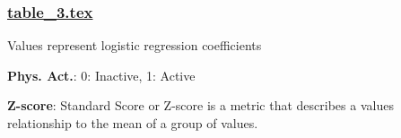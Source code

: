\documentclass[11pt]{article}
\begin{document}
\subsubsection*{\hyperlink{code-LaTeX Table Design-table-3-tex}{table\_3.tex}}

\begin{codeoutput}
\begin{table}[h]
\caption{Association between physical activity and heart disease among diabetics}
\label{table:association_coronary}
\begin{threeparttable}
\renewcommand{\TPTminimum}{\linewidth}
\begin{tablenotes}
\footnotesize
\item Values represent logistic regression coefficients
\item \textbf{Phys. Act.}: 0: Inactive, 1: Active
\item \textbf{Z-score}: Standard Score or Z-score is a metric that describes a values relationship to the mean of a group of values.
\end{tablenotes}
\end{threeparttable}
\end{table}

\end{codeoutput}
\end{document}
